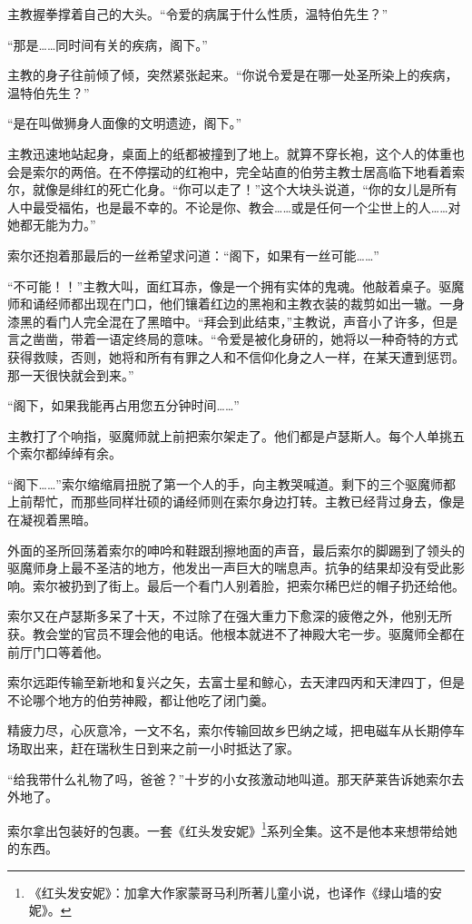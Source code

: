 \documentclass[AutoFakeBold=true]{book}
\begin{document}
主教握拳撑着自己的大头。``令爱的病属于什么性质，温特伯先生？''

``那是……同时间有关的疾病，阁下。''

主教的身子往前倾了倾，突然紧张起来。``你说令爱是在哪一处圣所染上的疾病，温特伯先生？''

``是在叫做狮身人面像的文明遗迹，阁下。''

主教迅速地站起身，桌面上的纸都被撞到了地上。就算不穿长袍，这个人的体重也会是索尔的两倍。在不停摆动的红袍中，完全站直的伯劳主教士居高临下地看着索尔，就像是绯红的死亡化身。``你可以走了！''这个大块头说道，``你的女儿是所有人中最受福佑，也是最不幸的。不论是你、教会……或是任何一个尘世上的人……对她都无能为力。''

索尔还抱着那最后的一丝希望求问道：``阁下，如果有一丝可能……''

``不可能！！''主教大叫，面红耳赤，像是一个拥有实体的鬼魂。他敲着桌子。驱魔师和诵经师都出现在门口，他们镶着红边的黑袍和主教衣装的裁剪如出一辙。一身漆黑的看门人完全混在了黑暗中。``拜会到此结束，''主教说，声音小了许多，但是言之凿凿，带着一语定终局的意味。``令爱是被化身研的，她将以一种奇特的方式获得救赎，否则，她将和所有有罪之人和不信仰化身之人一样，在某天遭到惩罚。那一天很快就会到来。''

``阁下，如果我能再占用您五分钟时间……''

主教打了个响指，驱魔师就上前把索尔架走了。他们都是卢瑟斯人。每个人单挑五个索尔都绰绰有余。

``阁下……''索尔缩缩肩扭脱了第一个人的手，向主教哭喊道。剩下的三个驱魔师都上前帮忙，而那些同样壮硕的诵经师则在索尔身边打转。主教已经背过身去，像是在凝视着黑暗。

外面的圣所回荡着索尔的呻吟和鞋跟刮擦地面的声音，最后索尔的脚踢到了领头的驱魔师身上最不圣洁的地方，他发出一声巨大的喘息声。抗争的结果却没有受此影响。索尔被扔到了街上。最后一个看门人别着脸，把索尔稀巴烂的帽子扔还给他。

索尔又在卢瑟斯多呆了十天，不过除了在强大重力下愈深的疲倦之外，他别无所获。教会堂的官员不理会他的电话。他根本就进不了神殿大宅一步。驱魔师全都在前厅门口等着他。

索尔远距传输至新地和复兴之矢，去富士星和鲸心，去天津四丙和天津四丁，但是不论哪个地方的伯劳神殿，都让他吃了闭门羹。

精疲力尽，心灰意冷，一文不名，索尔传输回故乡巴纳之域，把电磁车从长期停车场取出来，赶在瑞秋生日到来之前一小时抵达了家。

``给我带什么礼物了吗，爸爸？''十岁的小女孩激动地叫道。那天萨莱告诉她索尔去外地了。

索尔拿出包装好的包裹。一套《红头发安妮》\footnote{《红头发安妮》：加拿大作家蒙哥马利所著儿童小说，也译作《绿山墙的安妮》。}系列全集。这不是他本来想带给她的东西。
\end{document}
